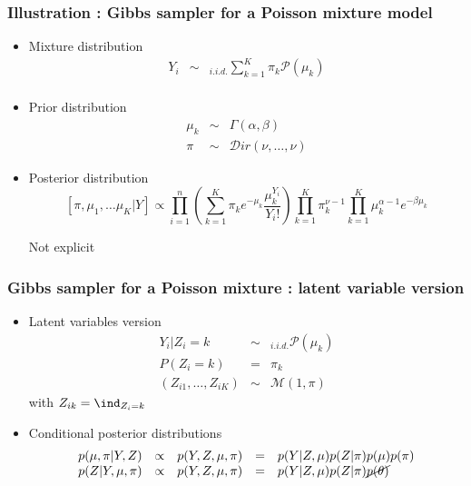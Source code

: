 \begin{frame}\frametitle{Illustration : Gibbs sampler for a Poisson mixture model}


\begin{itemize}
 \item  Mixture distribution 
 \begin{eqnarray*}
 Y_i &\sim&_{i.i.d.} \sum_{k=1}^K \pi_k \mathcal{P}(\mu_k)\\
  \end{eqnarray*}

\item Prior distribution
 \begin{eqnarray*}
 \mu_k &\sim& \Gamma(\alpha,\beta)\\
 \pi &\sim& \mathcal{D}ir(\nu, \dots, \nu)
 \end{eqnarray*}
 
\item Posterior distribution
$$[\pi, \mu_1, \dots \mu_K | Y] \propto \prod_{i=1}^n\left(\sum_{k=1}^K \pi_k e^{-\mu_k} \frac{\mu_k^{Y_i}}{Y_i!}\right) \prod_{k=1}^K\pi_k^{\nu-1}  \prod_{k=1}^K \mu_k^{\alpha-1} e^{-\beta \mu_k}
$$ 

\centering 

 \vert Not explicit
 
\end{itemize}
\end{frame}

\begin{frame}\frametitle{Gibbs sampler for a Poisson mixture : latent variable version}
\begin{itemize}
   \item Latent variables version
  \begin{eqnarray*}
 Y_i | Z_i = k &\sim&_{i.i.d.} \mathcal{P}(\mu_k)\\
 P(Z_i = k) &=& \pi_k\\
 (Z_{i1}, \dots,Z_{iK}) &\sim & \mathcal{M}(1, \pi) 
 \end{eqnarray*}
 with $Z_{ik} = \ind_{Z_i = k}$
 \item Conditional posterior distributions
\begin{equation*}
 \begin{array}{ccccl}
p(\mu,\pi | Y, Z) &\propto& p(Y,Z,\mu,\pi) &=& p(Y | Z, \mu) p(Z | \pi) p(\mu)  p(\pi)\\
p(Z | Y, \mu,\pi ) &\propto& p(Y,Z,\mu, \pi) &=& p(Y | Z, \mu) p(Z | \pi) \cancel{p(\theta)} \\
 \end{array}
\end{equation*}
\end{itemize}
\end{frame}


